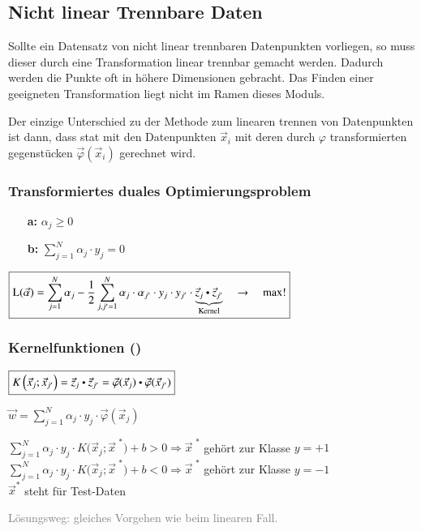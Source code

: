 \subsection{Nicht linear Trennbare Daten}
Sollte ein Datensatz von nicht linear trennbaren Datenpunkten vorliegen, so muss dieser durch eine Transformation linear trennbar gemacht werden.
Dadurch werden die Punkte oft in höhere Dimensionen gebracht.
Das Finden einer geeigneten Transformation liegt nicht im Ramen dieses Moduls.

Der einzige Unterschied zu der Methode zum linearen trennen von Datenpunkten ist dann, dass stat mit den Datenpunkten $\vec{x}_i$ mit deren durch $\varphi$ transformierten gegenstücken $\vec{\varphi}(\vec{x}_i)$ gerechnet wird.

\subsubsection{Transformiertes duales Optimierungsproblem}
    \begin{itemize}
        \item [\textbf{a:}] $\boxed{\alpha_j\geq0}$
        \item [\textbf{b:}] $\boxed{\sum_{j=1}^N\alpha_j \cdot y_j=0}$
    \end{itemize}
$\boxed{\mathrm{L}(\vec{\alpha})=\sum_{j=1}^N\alpha_j-\frac{1}{2}\sum_{j,j'=1}^N\alpha_j \cdot \alpha_{j'} \cdot \space y_j \cdot y_{j'} \cdot \space \underbrace{\vec{z}_j \dotp  \vec{z}_{j'}}_{\text{Kernel}} \quad\to\quad\max!}$

\subsubsection{Kernelfunktionen ()}
$\boxed{K\left( \vec{x}_j ; \vec{x}_{j'}\right) = \vec{z}_j \dotp \vec{z}_{j'}=\vec{\varphi}(\vec{x}_j) \dotp \vec{\varphi}(\vec{x}_{j'})}$

$\boxed{\vec{w}=\sum_{j=1}^N\alpha_j \cdot y_j \cdot \vec{\varphi}(\vec{x}_j)}$

$\boxed{\sum_{j=1}^N\alpha_j \cdot y_j \cdot K\Big(\vec{x}_j;\vec{x}^{\text{ *}} \Big)+b>0\Longrightarrow\vec{x}^{\text{ *}}}$ gehört zur Klasse $y = +1$\\
$\boxed{\sum_{j=1}^N\alpha_j \cdot y_j \cdot K\Big(\vec{x}_j;\vec{x}^{\text{ *}} \Big)+b<0\Longrightarrow\vec{x}^{\text{ *}}}$ gehört zur Klasse $y = -1$\\
$\vec{x}^*$ steht für Test-Daten

\medskip
\textcolor{gray}{Lösungsweg: gleiches Vorgehen wie beim linearen Fall.}

